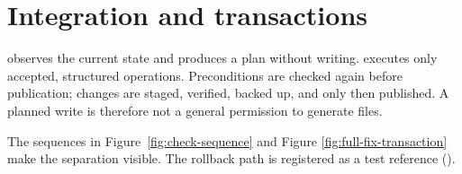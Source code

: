 \section{Integration and transactions}
\label{chap:integration-transactions}

\CheckMode{} observes the current state and produces a plan without writing. \FullFix{}
executes only accepted, structured operations. Preconditions are checked again before
publication; changes are staged, verified, backed up, and only then published. A planned
write is therefore not a general permission to generate files.

The sequences in Figure~\ref{fig:check-sequence} and Figure
\ref{fig:full-fix-transaction} make the separation visible. The rollback path is
registered as a \Verified{} test reference ().
